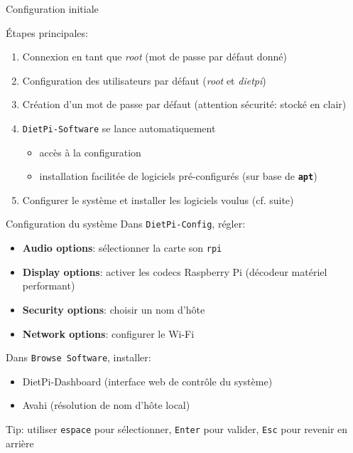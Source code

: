 \documentclass[
aspectratio=169 %
]{beamer}
\newcommand{\cmd}[1]{\texttt{\textbf{#1}}}
\begin{document}
\begin{frame}{Configuration initiale}

    Étapes principales:
    \begin{enumerate}
        \item Connexion en tant que \textit{root} (mot de passe par défaut
              donné)
        \item Configuration des utilisateurs par défaut (\textit{root} et
              \textit{dietpi})
        \item Création d'un mot de passe par défaut (attention sécurité: stocké
              en clair)
        \item \texttt{DietPi-Software} se lance automatiquement
              \begin{itemize}
                  \item accès à la configuration
                  \item installation facilitée de logiciels pré-configurés
                        (sur base de \cmd{apt})
              \end{itemize}
        \item Configurer le système et installer les logiciels voulus (cf.
              suite)
    \end{enumerate}
\end{frame}

\begin{frame}{Configuration du système}
    Dans \texttt{DietPi-Config}, régler:

    \begin{itemize}
        \item \textbf{Audio options}: sélectionner la carte son \texttt{rpi}
        \item \textbf{Display options}: activer les codecs Raspberry Pi
              (décodeur matériel performant)
        \item \textbf{Security options}: choisir un nom d'hôte
        \item \textbf{Network options}: configurer le Wi-Fi
    \end{itemize}

    \bigskip
    Dans \texttt{Browse Software}, installer:
    \begin{itemize}
        \item DietPi-Dashboard (interface web de contrôle du système)
        \item Avahi (résolution de nom d'hôte local)
    \end{itemize}

    \bigskip
    \alert{Tip:} utiliser \texttt{espace} pour sélectionner, \texttt{Enter} pour
    valider, \texttt{Esc} pour revenir en arrière
\end{frame}
\end{document}
